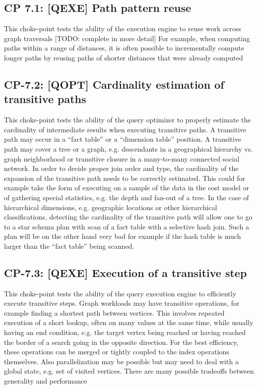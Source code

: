\subsection*{CP 7.1: [QEXE] Path pattern reuse}
\label{choke_point_7.1}
This choke-point tests the ability of the execution engine to reuse work across graph traversals [TODO: complete in more detail]
For example, when computing paths within a range of distances, it is often possible to incrementally compute longer paths by reusing paths of shorter distances that were already computed



\subsection*{CP-7.2: [QOPT]  Cardinality estimation of transitive paths}
\label{choke_point_7.2}
This choke-point tests the ability of the query optimizer to properly estimate the cardinality of intermediate results when executing transitive paths. A transitive path may occur in a ``fact table'' or a ``dimension table'' position.
A transitive path may cover a tree or a graph, e.g. descendants in a geographical hierarchy vs. graph neighborhood or transitive closure in a many-to-many connected social network.
In order to decide proper join order and type, the cardinality of the expansion of the transitive path needs to be correctly estimated.
This could for example take the form of executing on a sample of the data in the cost model or of gathering special statistics, e.g. the depth and fan-out of a tree. In the case of hierarchical dimensions,
e.g. geographic locations or other hierarchical classifications, detecting the cardinality of the transitive path will allow one to go to a star schema plan with scan of a fact table with a selective hash join.
Such a plan will be on the other hand very bad for example if the hash table is much larger than the ``fact table'' being scanned.



\subsection*{CP-7.3: [QEXE] Execution of a transitive step}
\label{choke_point_7.3}
This choke-point tests the ability of the query execution engine to efficiently execute transitive steps. Graph workloads may have transitive operations, for example finding a shortest path between vertices.
This involves repeated execution of a short lookup, often on many values at the same time, while usually having an end condition, e.g. the target vertex being reached or having reached the border of a search going in the opposite direction.
For the best efficiency, these operations can be merged or tightly coupled to the index operations themselves. Also parallelization may be possible but may need to deal with a global state, e.g. set of visited vertices.
There are many possible tradeoffs between generality and performance

